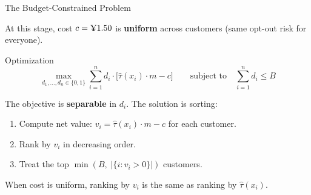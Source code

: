 \documentclass[aspectratio=169, 11pt, handout]{beamer}
\begin{document}
\begin{frame}{The Budget-Constrained Problem}

At this stage, cost $c = \text{\textyen}1.50$ is \textbf{uniform} across customers (same opt-out risk for everyone).

\begin{block}{Optimization}
\vspace{-0.5em}
\[
\max_{d_1, \ldots, d_n \in \{0,1\}} \sum_{i=1}^{n} d_i \cdot \bigl[\hat{\tau}(x_i) \cdot m - c\bigr] \qquad \text{subject to} \quad \sum_{i=1}^{n} d_i \leq B
\]
\end{block}

\pause
\bigskip

The objective is \textbf{separable} in $d_i$. The solution is sorting:

\begin{enumerate}
    \item Compute net value: $v_i = \hat{\tau}(x_i) \cdot m - c$ for each customer.
    \item Rank by $v_i$ in decreasing order.
    \item Treat the top $\min(B,\; |\{i : v_i > 0\}|)$ customers.
\end{enumerate}

\pause
\bigskip

When cost is uniform, ranking by $v_i$ is the same as ranking by $\hat{\tau}(x_i)$.

\end{frame}
\end{document}
